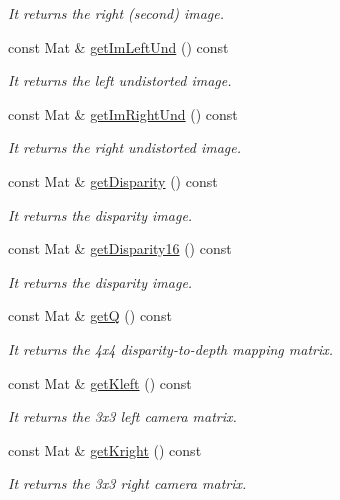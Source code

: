 \begin{DoxyCompactItemize}
\begin{DoxyCompactList}\small\item\em It returns the right (second) image. \end{DoxyCompactList}\item 
const Mat \& \hyperlink{classStereoCamera_a4c43eac96ec0751a5505217a456fce58}{get\+Im\+Left\+Und} () const 
\begin{DoxyCompactList}\small\item\em It returns the left undistorted image. \end{DoxyCompactList}\item 
const Mat \& \hyperlink{classStereoCamera_a72e3d27c93a1916c20dacc085116ec20}{get\+Im\+Right\+Und} () const 
\begin{DoxyCompactList}\small\item\em It returns the right undistorted image. \end{DoxyCompactList}\item 
const Mat \& \hyperlink{classStereoCamera_a6a7ab732bde7139f180d95952a4051c5}{get\+Disparity} () const 
\begin{DoxyCompactList}\small\item\em It returns the disparity image. \end{DoxyCompactList}\item 
const Mat \& \hyperlink{classStereoCamera_ad9c1e4c8282aa12a8033bf5f2b7a38d7}{get\+Disparity16} () const 
\begin{DoxyCompactList}\small\item\em It returns the disparity image. \end{DoxyCompactList}\item 
const Mat \& \hyperlink{classStereoCamera_af13263c1c8d3e91914e94223c2bbb5fa}{getQ} () const 
\begin{DoxyCompactList}\small\item\em It returns the 4x4 disparity-\/to-\/depth mapping matrix. \end{DoxyCompactList}\item 
const Mat \& \hyperlink{classStereoCamera_a12fc6e8c4859a912d6b17d1e4216fb1c}{get\+Kleft} () const 
\begin{DoxyCompactList}\small\item\em It returns the 3x3 left camera matrix. \end{DoxyCompactList}\item 
const Mat \& \hyperlink{classStereoCamera_ac78f7f6b91f936b51a7eb8570d0c48ac}{get\+Kright} () const 
\begin{DoxyCompactList}\small\item\em It returns the 3x3 right camera matrix. \end{DoxyCompactList}\item 

\end{DoxyCompactItemize}
